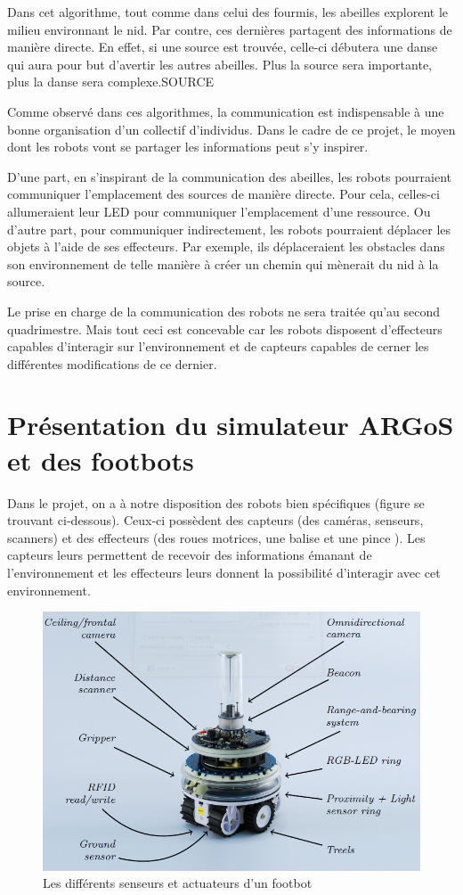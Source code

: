 \documentclass[a4paper]{report}
\begin{document}
Dans cet algorithme, tout comme dans celui des fourmis, les abeilles explorent le milieu environnant le nid. Par contre, ces dernières partagent des informations de manière directe. En effet, si une source est trouvée, celle-ci débutera une danse qui aura pour but d'avertir les autres abeilles. Plus la source sera importante, plus la danse sera complexe.SOURCE

Comme observé dans ces algorithmes, la communication est indispensable à une bonne organisation d'un collectif d'individus. Dans le cadre de ce projet, le moyen dont les robots vont se partager les informations peut s'y inspirer.

D'une part, en s'inspirant de la communication des abeilles, les robots pourraient communiquer l'emplacement des sources de manière directe. Pour cela, celles-ci allumeraient leur LED pour communiquer l'emplacement d'une ressource. Ou d'autre part, pour communiquer indirectement, les robots pourraient déplacer les objets à l'aide de ses effecteurs. Par exemple, ils déplaceraient les obstacles dans son environnement de telle manière à créer un chemin qui mènerait du nid à la source.

Le prise en charge de la communication des robots ne sera traitée qu'au second quadrimestre. Mais tout ceci est concevable car les robots disposent d'effecteurs capables d'interagir sur l'environnement et de capteurs capables de cerner les différentes modifications de ce dernier.

\chapter{Présentation du simulateur ARGoS et des footbots\label{chap:argosFootbot}}

Dans le projet, on a à notre disposition des robots bien spécifiques (figure se trouvant ci-dessous). Ceux-ci possèdent des capteurs (des caméras, senseurs, scanners) et des effecteurs (des roues motrices, une balise et une pince ). Les capteurs leurs permettent de recevoir des informations émanant de l'environnement et les effecteurs leurs donnent la possibilité d’interagir avec cet environnement.
\begin{figure}[h!]
   \includegraphics[width=\textwidth]{footbot.png}
      \caption{Les différents senseurs et actuateurs d'un footbot\cite{argosSite1}}
\end{figure}
\end{document}
